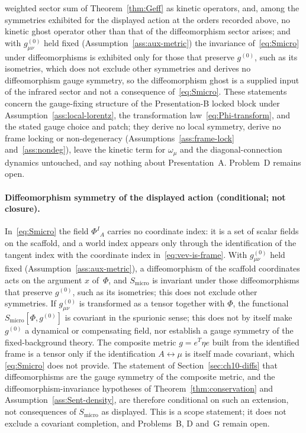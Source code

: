 weighted sector sum of Theorem~\ref{thm:Geff} as kinetic operators, and, among the symmetries exhibited
for the displayed action at the orders recorded above, no
kinetic ghost operator other than that of the diffeomorphism
sector arises; and with \(g^{(0)}_{\mu\nu}\) held fixed
(Assumption~\ref{ass:aux-metric}) the invariance
of~\eqref{eq:Smicro} under diffeomorphisms is exhibited only
for those that preserve \(g^{(0)}\), such as its isometries,
which does not exclude other symmetries and derives no
diffeomorphism gauge symmetry, so the diffeomorphism ghost is
a supplied input of the infrared sector and not a consequence
of~\eqref{eq:Smicro}.
These statements concern the gauge-fixing structure of the Presentation-B locked
block under Assumption~\ref{ass:local-lorentz}, the
transformation law~\eqref{eq:Phi-transform}, and the stated gauge choice and
patch; they derive no local symmetry, derive no frame locking or
non-degeneracy (Assumptions~\ref{ass:frame-lock} and~\ref{ass:nondeg}), leave
the kinetic term for \(\omega_\mu\) and the diagonal-connection dynamics
untouched, and say nothing about Presentation~A. Problem~D remains open.

\paragraph{Diffeomorphism symmetry of the displayed action (conditional; not closure).}
In~\eqref{eq:Smicro} the field \(\Phi^I{}_A\) carries no coordinate index: it
is a set of scalar fields on the scaffold, and a world index appears only
through the identification of the tangent index with the coordinate index
in~\eqref{eq:vev-is-frame}. With \(g^{(0)}_{\mu\nu}\) held fixed
(Assumption~\ref{ass:aux-metric}), a diffeomorphism of the scaffold coordinates
acts on the argument \(x\) of~\(\Phi\), and \(S_{\mathrm{micro}}\) is
invariant under those diffeomorphisms that preserve \(g^{(0)}\), such as its
isometries; this does not exclude other symmetries. If \(g^{(0)}_{\mu\nu}\) is
transformed as a tensor together with \(\Phi\), the functional
\(S_{\mathrm{micro}}[\Phi,g^{(0)}]\) is covariant in the spurionic sense; this
does not by itself make \(g^{(0)}\) a dynamical or compensating field, nor
establish a gauge symmetry of the fixed-background theory. The composite
metric \(g=e^{T}\eta e\) built from the identified frame is a tensor only if
the identification \(A\leftrightarrow\mu\) is itself made covariant, which
\eqref{eq:Smicro} does not provide. The statement of
Section~\ref{sec:ch10-diffs} that diffeomorphisms are the gauge symmetry of
the composite metric, and the diffeomorphism-invariance hypotheses of
Theorem~\ref{thm:conservation} and Assumption~\ref{ass:Sent-density}, are
therefore conditional on such an extension, not consequences of
\(S_{\mathrm{micro}}\) as displayed. This is a scope statement; it does not
exclude a covariant completion, and Problems~B, D and~G remain open.

